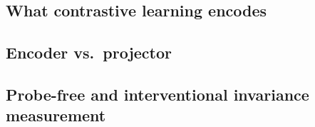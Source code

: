\documentclass[11pt]{article}
\begin{document}
\subsection{What contrastive learning encodes}
\subsection{Encoder vs.\ projector}
\subsection{Probe-free and interventional invariance measurement}
\end{document}
